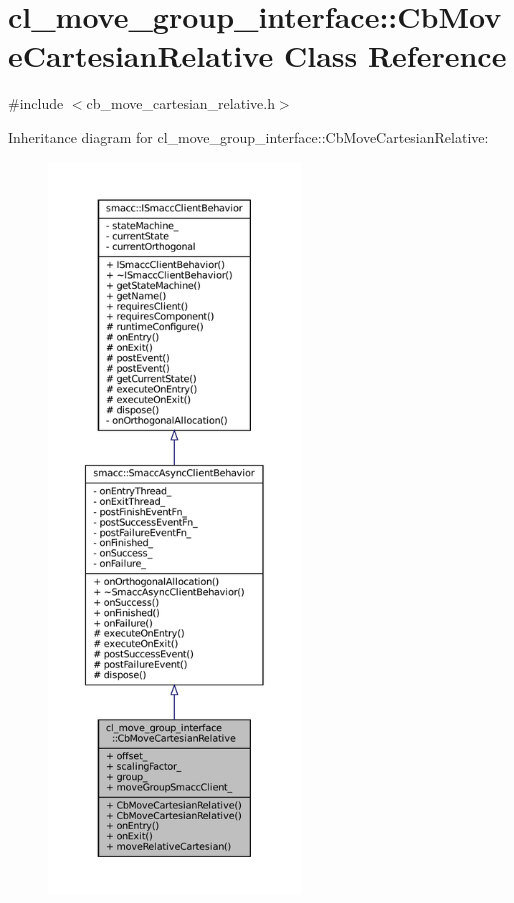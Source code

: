 \hypertarget{classcl__move__group__interface_1_1CbMoveCartesianRelative}{}\section{cl\+\_\+move\+\_\+group\+\_\+interface\+:\+:Cb\+Move\+Cartesian\+Relative Class Reference}
\label{classcl__move__group__interface_1_1CbMoveCartesianRelative}


{\ttfamily \#include $<$cb\+\_\+move\+\_\+cartesian\+\_\+relative.\+h$>$}



Inheritance diagram for cl\+\_\+move\+\_\+group\+\_\+interface\+:\+:Cb\+Move\+Cartesian\+Relative\+:
\nopagebreak
\begin{figure}[H]
\begin{center}
\leavevmode
\includegraphics[height=550pt]{classcl__move__group__interface_1_1CbMoveCartesianRelative__inherit__graph}
\end{center}
\end{figure}



